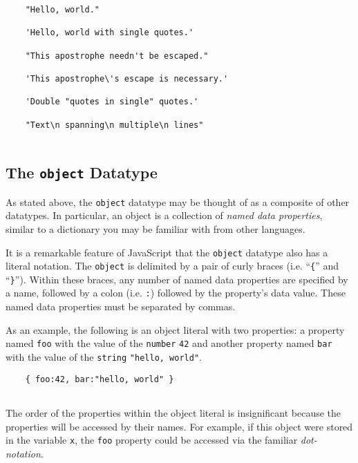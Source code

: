 \documentclass[11pt,letter]{book}
\begin{document}
    \begin{verbatim}
    "Hello, world."
    
    'Hello, world with single quotes.'
    
    "This apostrophe needn't be escaped."
    
    'This apostrophe\'s escape is necessary.'
    
    'Double "quotes in single" quotes.'
    
    "Text\n spanning\n multiple\n lines"
    
    \end{verbatim}
    
    \subsection{The \texttt{object} Datatype}
    
    As stated above, the \texttt{object} datatype may be thought of as a composite of other 
    datatypes. In particular, an object is a collection of \emph{named data properties}, similar
    to a dictionary you may be familiar with from other languages.
    
    It is a remarkable feature of JavaScript that the \texttt{object} datatype also has a literal
    notation. The \texttt{object} is delimited by a pair of curly braces (i.e. ``\texttt{\{}'' and 
    ``\texttt{\}}''). Within these braces, any number of named data properties are specified by a 
    name, followed by a colon (i.e. \texttt{:}) followed by the property's data value. These named 
    data properties must be separated by commas.
    
    As an example, the following is an object literal with two properties: a property named 
    \texttt{foo} with the value of the \texttt{number} \texttt{42} and another property named 
    \texttt{bar} with the value of the \texttt{string} \texttt{"hello, world"}.
    
    \begin{verbatim}
    { foo:42, bar:"hello, world" }
    
    \end{verbatim}
    
    The order of the properties within the object literal is insignificant because the properties
    will be accessed by their names. For example, if this object were stored in the variable 
    \texttt{x}, the \texttt{foo} property could be accessed via the familiar \emph{dot-notation}.
    
\end{document}
